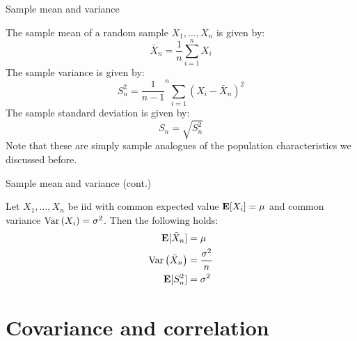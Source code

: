 \documentclass[compress, 8pt]{beamer}
\begin{document}
\begin{frame}{Sample mean and variance}

The sample mean of a random sample $X_1, \dots, X_n$ is given by:
\begin{equation*}
    \bar{X}_n = \frac{1}{n} \sum_{i=1}^n X_i
\end{equation*}
The sample variance is given by:
\begin{equation*}
    S_n^2 = \frac{1}{n - 1}^n \sum_{i=1} (X_i - \bar{X}_n)^2
\end{equation*}
The sample standard deviation is given by:
\begin{equation*}
    S_n = \sqrt{S_n^2}
\end{equation*}
Note that these are simply sample analogues of the population characteristics we discussed before.


\end{frame}

\begin{frame}{Sample mean and variance (cont.)}

Let $X_1, \dots, X_n$ be iid with common expected value $\mathbf{E} [X_i] = \mu$ and common variance $\text{Var} \left( X_i \right) = \sigma^2$. Then the following holds:
\begin{align*}
    \mathbf{E} [\bar{X}_n] &= \mu \\
    \text{Var} \left( \bar{X}_n \right) &= \frac{\sigma^2}{n} \\
    \mathbf{E} [S_n^2] &= \sigma^2
\end{align*}

\end{frame}

\section{Covariance and correlation}
\miniframesoff
\begin{frame}
    \tableofcontents[currentsection]
\end{frame}
\miniframeson
\end{document}
